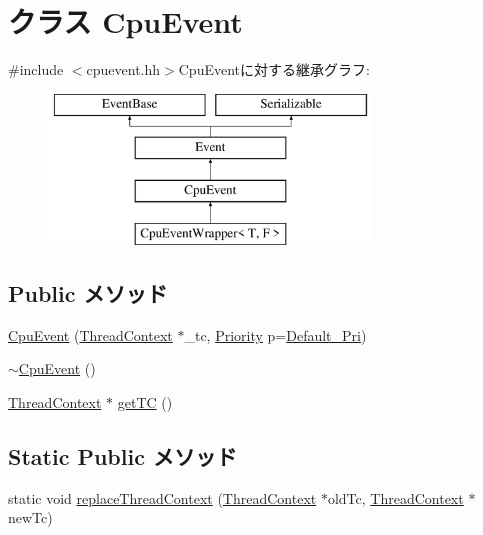 \hypertarget{classCpuEvent}{
\section{クラス CpuEvent}
\label{classCpuEvent}
}


{\ttfamily \#include $<$cpuevent.hh$>$}CpuEventに対する継承グラフ:\begin{figure}[H]
\begin{center}
\leavevmode
\includegraphics[height=4cm]{classCpuEvent}
\end{center}
\end{figure}
\subsection*{Public メソッド}
\begin{DoxyCompactItemize}
\item 
\hyperlink{classCpuEvent_ac2509f47e48618aceb1bbd19cddb51a7}{CpuEvent} (\hyperlink{classThreadContext}{ThreadContext} $\ast$\_\-tc, \hyperlink{classEventBase_a6d92f7ee8144a5911ed46d85a89a4934}{Priority} p=\hyperlink{classEventBase_a6bd0fef0ad63ee49ad5ece92a9dd5f8f}{Default\_\-Pri})
\item 
\hyperlink{classCpuEvent_a258f48595df111cbfc722fb3aadcf3cf}{$\sim$CpuEvent} ()
\item 
\hyperlink{classThreadContext}{ThreadContext} $\ast$ \hyperlink{classCpuEvent_a81894d15db5190d5364449a4915b76f5}{getTC} ()
\end{DoxyCompactItemize}
\subsection*{Static Public メソッド}
\begin{DoxyCompactItemize}
\item 
static void \hyperlink{classCpuEvent_abc7c937eda3f3c20297a24ba96396447}{replaceThreadContext} (\hyperlink{classThreadContext}{ThreadContext} $\ast$oldTc, \hyperlink{classThreadContext}{ThreadContext} $\ast$newTc)
\end{DoxyCompactItemize}
